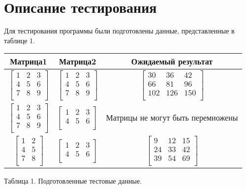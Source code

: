 \section{Описание тестирования}
Для тестирования программы были подготовлены данные, представленные в таблице 1.
	\begin{center}
		\begin{tabular}{  | c | c | c | }
			\hline
			\textbf{Матрица1} & \textbf{Матрица2} & \textbf{Ожидаемый результат} \\ \hline
			$\begin{bmatrix} 
   			1&2&3 \\
    			4&5&6 \\ 
   			7&8&9 \\ 
			\end{bmatrix}$ & 
			$\begin{bmatrix} 
   			1&2&3 \\
    			4&5&6 \\ 
   			7&8&9 \\ 
			\end{bmatrix}$ &
			$\begin{bmatrix} 
   			30&36&42 \\
    			66&81&96 \\ 
   			102&126&150 \\ 
			\end{bmatrix} $ \\ \hline
			
			$\begin{bmatrix} 
   			1&2&3 \\
    			4&5&6 \\ 
   			7&8&9 \\ 
			\end{bmatrix}$ & 
			$\begin{bmatrix} 
   			1&2&3 \\
    			4&5&6 \\ 
			\end{bmatrix}$ &
			$\text{Матрицы не могут быть перемножены}$ \\ \hline
			
			$\begin{bmatrix} 
   			1&2 \\
    			4&5 \\ 
   			7&8 \\ 
			\end{bmatrix}$ & 
			$\begin{bmatrix} 
   			1&2&3 \\
    			4&5&6 \\ 
			\end{bmatrix}$ &
			$\begin{bmatrix} 
   			9&12&15 \\
    			24&33&42 \\ 
   			39&54&69 \\ 
			\end{bmatrix} $ \\ \hline
		\end{tabular}
		
		\hfill
		
		Таблица 1.
		Подготовленные тестовые данные.  
	\end{center}
	
